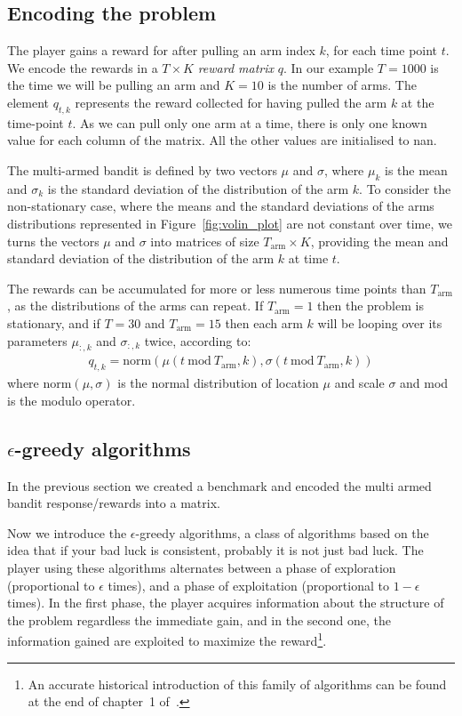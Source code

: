 \documentclass[]{scrartcl}
\theoremstyle{definition}
\begin{document}
\subsection*{Encoding the problem}
The player gains a reward for after pulling an arm index $k$, for each time point $t$. We encode the rewards in a $T\times K$ \emph{reward matrix} $q$. In our example $T=1000$ is the time we will be pulling an arm and $K=10$ is the number of arms. The element $q_{t, k}$ represents the reward collected for having pulled the arm $k$ at the time-point $t$. As we can pull only one arm at a time, there is only one known value for each column of the matrix. All the other values are initialised to nan.

The multi-armed bandit is defined by two vectors $\mu$ and $\sigma$, where $\mu_k$ is the mean and $\sigma_k$ is the standard deviation of the distribution of the arm $k$.
To consider the non-stationary case, where the means and the standard deviations of the arms distributions represented in Figure~\ref{fig:volin_plot} are not constant over time, we turns the vectors $\mu$ and $\sigma$ into matrices of size $T_{\text{arm}} \times K$, providing the mean and standard deviation of the distribution of the arm $k$ at time $t$.

The rewards can be accumulated for more or less numerous time points than $T_{\text{arm}}$, as the distributions of the arms can repeat. If $T_{\text{arm}}=1$ then the problem is stationary, and if $T=30$ and $T_{\text{arm}}=15$ then each arm $k$ will be looping over its parameters $\mu_{:, k}$ and $\sigma_{:, k}$ twice, according to:
\begin{align*}
q_{t, k}
=
\text{norm}\left(\mu({t~\text{mod}~T_{\text{arm}}, k}), \sigma({t~\text{mod}~T_{\text{arm}}, k})\right)
\end{align*}
where $\text{norm}(\mu, \sigma)$ is the normal distribution of location $\mu$ and scale $\sigma$ and mod is the modulo operator.

\subsection*{$\epsilon$-greedy algorithms}

In the previous section we created a benchmark and encoded the multi armed bandit response/rewards into a matrix.

Now we introduce the $\epsilon$-greedy algorithms,
a class of algorithms based on the idea that if your bad luck is consistent, probably it is not just bad luck. The player using these algorithms alternates between a phase of exploration (proportional to $\epsilon$ times), and a phase of exploitation (proportional to $1 - \epsilon$ times). In the first phase, the player acquires information about the structure of the problem regardless the immediate gain, and in the second one, the information gained are exploited to maximize the reward\footnote{
    An accurate historical introduction of this family of algorithms can be found at the end of chapter~1 of~\cite{sutton2018reinforcement}.
}.
\end{document}
